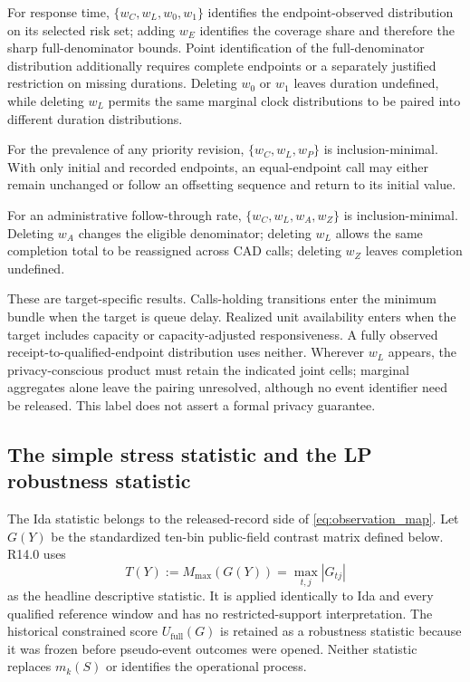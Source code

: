 \documentclass[11pt]{article}
\begin{document}
\begin{plainbox}[title=Target-specific witness-necessity results]
For response time, $\{w_C,w_L,w_0,w_1\}$ identifies the endpoint-observed distribution on its selected risk set; adding $w_E$ identifies the coverage share and therefore the sharp full-denominator bounds. Point identification of the full-denominator distribution additionally requires complete endpoints or a separately justified restriction on missing durations. Deleting $w_0$ or $w_1$ leaves duration undefined, while deleting $w_L$ permits the same marginal clock distributions to be paired into different duration distributions.

For the prevalence of any priority revision, $\{w_C,w_L,w_P\}$ is inclusion-minimal. With only initial and recorded endpoints, an equal-endpoint call may either remain unchanged or follow an offsetting sequence and return to its initial value.

For an administrative follow-through rate, $\{w_C,w_L,w_A,w_Z\}$ is inclusion-minimal. Deleting $w_A$ changes the eligible denominator; deleting $w_L$ allows the same completion total to be reassigned across CAD calls; deleting $w_Z$ leaves completion undefined.
\end{plainbox}

These are target-specific results. Calls-holding transitions enter the minimum bundle when the target is queue delay. Realized unit availability enters when the target includes capacity or capacity-adjusted responsiveness. A fully observed receipt-to-qualified-endpoint distribution uses neither. Wherever $w_L$ appears, the privacy-conscious product must retain the indicated joint cells; marginal aggregates alone leave the pairing unresolved, although no event identifier need be released. This label does not assert a formal privacy guarantee.

\subsection{The simple stress statistic and the LP robustness statistic}

The Ida statistic belongs to the released-record side of \cref{eq:observation_map}. Let $G(Y)$ be the standardized ten-bin public-field contrast matrix defined below. R14.0 uses
\begin{equation}
T(Y):=M_{\max}(G(Y))=\max_{t,j}|G_{tj}|
\label{eq:stress_diagnostic}
\end{equation}
as the headline descriptive statistic. It is applied identically to Ida and every qualified reference window and has no restricted-support interpretation. The historical constrained score $U_{\mathrm{full}}(G)$ is retained as a robustness statistic because it was frozen before pseudo-event outcomes were opened. Neither statistic replaces $m_k(S)$ or identifies the operational process.
\end{document}
